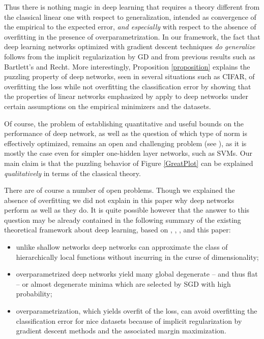 \documentclass[10pt]{article}
\begin{document}
Thus there is nothing magic in deep learning that requires a theory
different from the classical linear one with respect to
generalization, intended as convergence of the empirical to the
expected error, {\it and especially} with respect to the absence of
overfitting in the presence of overparametrization. In our framework,
the fact that deep learning networks optimized with gradient descent
techniques {\it do generalize} follows from the implicit
regularization by GD and from previous results such as
Bartlett's\cite{AntBartlett2002} and
Recht\cite{DBLP:journals/corr/HardtRS15}.  More interestingly,
Proposition \ref{proposition} explains the puzzling property of deep
networks, seen in several situations such as CIFAR, of overfitting the
loss while not overfitting the classification error by showing that
the properties of linear networks emphasized by
\cite{2017arXiv171010345S} apply to deep networks under certain
assumptions on the empirical minimizers and the datasets.


Of course, the problem of establishing quantitative and useful bounds
on the performance of deep network, as well as the question of which
type of norm is effectively optimized, remains an open and challenging
problem (see \cite{DBLP:journals/corr/abs-1711-01530}), as it is
mostly the case even for simpler one-hidden layer networks, such as
SVMs. Our main claim is that the puzzling behavior of Figure
\ref{GreatPlot} can be explained {\it qualitatively} in terms of the
classical theory.

There are of course a number of open problems. Though we explained the
absence of overfitting we did not explain in this paper why deep
networks perform as well as they do. It is quite possible however that
the answer to this question may be already contained in the following
summary of the existing theoretical framework about deep learning,
based on  \cite{Theory_I}, \cite{Theory_II},
\cite{Theory_IIb},  \cite{DBLP:journals/corr/abs-1711-01530} and  this paper:

\begin{itemize}
\item unlike shallow networks deep networks can approximate the class
  of hierarchically local functions without incurring in the curse of
  dimensionality\cite{MhaskarPoggio2016b,Theory_I};
\item overparametrized deep networks yield many global degenerate --
  and thus flat -- or almost degenerate minima\cite{Theory_II} which are
  selected by SGD with high probability\cite{Theory_IIb};
\item overparametrization, which yields overfit of the loss, can avoid
  overfitting the classification error for nice datasets  because of implicit
  regularization by gradient descent methods and the associated 
  margin maximization.

\end{itemize}
\end{document}
